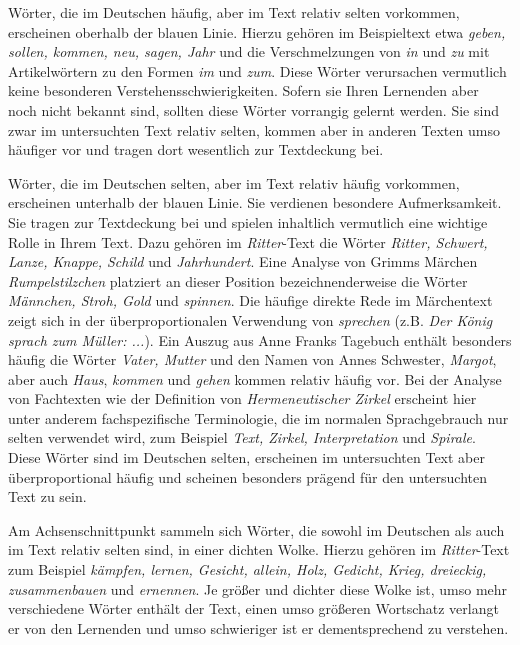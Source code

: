 \documentclass[11pt]{article}\usepackage[]{graphicx}\usepackage[]{color}
\begin{document}
Wörter, die im Deutschen häufig, aber im Text relativ selten vorkommen, erscheinen oberhalb der blauen Linie. Hierzu gehören im Beispieltext etwa \textit{geben, sollen, kommen, neu, sagen, Jahr} und die Verschmelzungen von \textit{in} und \textit{zu} mit Artikelwörtern zu den Formen \textit{im} und \textit{zum}. Diese Wörter verursachen vermutlich keine besonderen Verstehensschwierigkeiten. Sofern sie Ihren Lernenden aber noch nicht bekannt sind, sollten diese Wörter vorrangig gelernt werden. Sie sind zwar im untersuchten Text relativ selten, kommen aber in anderen Texten umso häufiger vor und tragen dort wesentlich zur Textdeckung bei.

Wörter, die im Deutschen selten, aber im Text relativ häufig vorkommen, erscheinen unterhalb der blauen Linie. Sie verdienen besondere Aufmerksamkeit. Sie tragen zur Textdeckung bei und spielen inhaltlich vermutlich eine wichtige Rolle in Ihrem Text. Dazu gehören im \textit{Ritter}-Text die Wörter \textit{Ritter, Schwert, Lanze, Knappe, Schild} und \textit{Jahrhundert}. Eine Analyse von Grimms Märchen \textit{Rumpelstilzchen} platziert an dieser Position bezeichnenderweise die Wörter \textit{Männchen, Stroh, Gold} und \textit{spinnen}. Die häufige direkte Rede im Märchentext zeigt sich in der überproportionalen Verwendung von \textit{sprechen} (z.B. \textit{Der König sprach zum Müller: ...}). Ein Auszug aus Anne Franks Tagebuch enthält besonders häufig die Wörter \textit{Vater, Mutter} und den Namen von Annes Schwester, \textit{Margot}, aber auch \textit{Haus}, \textit{kommen} und \textit{gehen} kommen relativ häufig vor. Bei der Analyse von Fachtexten wie der Definition von \textit{Hermeneutischer Zirkel} erscheint hier unter anderem fachspezifische Terminologie, die im normalen Sprachgebrauch nur selten verwendet wird, zum Beispiel \textit{Text, Zirkel, Interpretation} und \textit{Spirale}. Diese Wörter sind im Deutschen selten, erscheinen im untersuchten Text aber überproportional häufig und scheinen besonders prägend für den untersuchten Text zu sein. 

Am Achsenschnittpunkt sammeln sich Wörter, die sowohl im Deutschen als auch im Text relativ selten sind, in einer dichten Wolke. Hierzu gehören im \textit{Ritter}-Text zum Beispiel \textit{kämpfen, lernen, Gesicht, allein, Holz, Gedicht, Krieg, dreieckig, zusammenbauen} und \textit{ernennen}. Je größer und dichter diese Wolke ist, umso mehr verschiedene Wörter enthält der Text, einen umso größeren Wortschatz verlangt er von den Lernenden und umso schwieriger ist er dementsprechend zu verstehen. 
\end{document}
